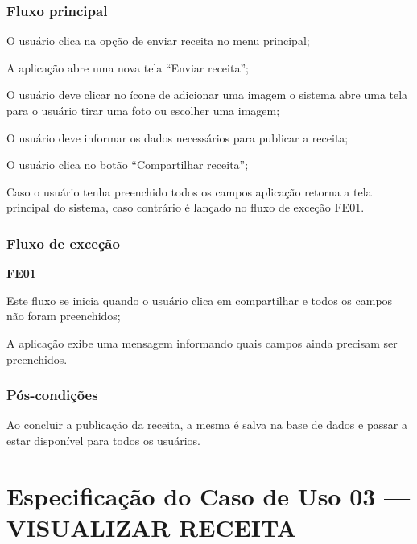 \subsubsection*{Fluxo principal}
\begin{lista}
	\item O usuário clica na opção de enviar receita no menu principal;
	\item A aplicação abre uma nova tela “Enviar receita”;
	\item  O usuário deve clicar no ícone de adicionar uma imagem o sistema abre uma tela para o usuário tirar uma foto ou escolher uma imagem;
	\item  O usuário deve informar os dados necessários para publicar a receita;
	\item  O usuário clica no botão “Compartilhar receita”;
	\item  Caso o usuário tenha preenchido todos os campos aplicação retorna a tela principal do sistema, caso contrário é lançado no fluxo de exceção FE01.	
\end{lista}

\subsubsection*{Fluxo de exceção}

\begin{lista}
	\item \textbf{FE01}
	\begin{lista}
		\item Este fluxo se inicia quando o usuário clica em compartilhar e todos os campos não foram preenchidos;
		\item A aplicação exibe uma mensagem informando quais campos ainda precisam ser preenchidos.
	\end{lista}
\end{lista}

\subsubsection*{Pós-condições}
Ao concluir a publicação da receita, a mesma é salva na base de dados e passar a estar disponível para todos os usuários. 

\pagebreak


\section*{Especificação do Caso de Uso 03 --- VISUALIZAR RECEITA}
